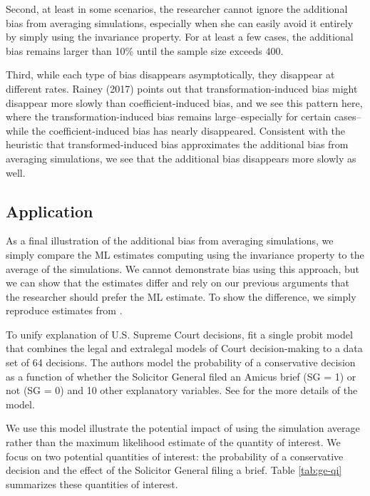 \documentclass[11pt]{article}
\begin{document}
Second, at least in some scenarios, the researcher cannot ignore the additional bias from averaging simulations, especially when she can easily avoid it entirely by simply using the invariance property.
For at least a few cases, the additional bias remains larger than 10\% until the sample size exceeds 400. 

Third, while each type of bias disappears asymptotically, they disappear at different rates. 
Rainey (2017) points out that transformation-induced bias might disappear more slowly than coefficient-induced bias, and we see this pattern here, where the transformation-induced bias remains large--especially for certain cases--while the coefficient-induced bias has nearly disappeared.
Consistent with the heuristic that transformed-induced bias approximates the additional bias from averaging simulations, we see that the additional bias disappears more slowly as well.

\subsection*{Application}

As a final illustration of the additional bias from averaging simulations, we simply compare the ML estimates computing using the invariance property to the average of the simulations. 
We cannot demonstrate bias using this approach, but we can show that the estimates differ and rely on our previous arguments that the researcher should prefer the ML estimate. 
To show the difference, we simply reproduce estimates from \cite{GeorgeEpstein1992}.

To unify explanation of U.S. Supreme Court decisions, \cite{GeorgeEpstein1992} fit a single probit model that combines the legal and extralegal models of Court decision-making to a data set of 64 decisions.
The authors model the probability of a conservative decision as a function of whether the Solicitor General filed an Amicus brief (SG = 1) or not (SG = 0) and 10 other explanatory variables.
See \cite{GeorgeEpstein1992} for the more details of the model.

We use this model illustrate the potential impact of using the simulation average rather than the maximum likelihood estimate of the quantity of interest.
We focus on two potential quantities of interest: the probability of a conservative decision and the effect of the Solicitor General filing a brief.
Table \ref{tab:ge-qi} summarizes these quantities of interest.
\end{document}
